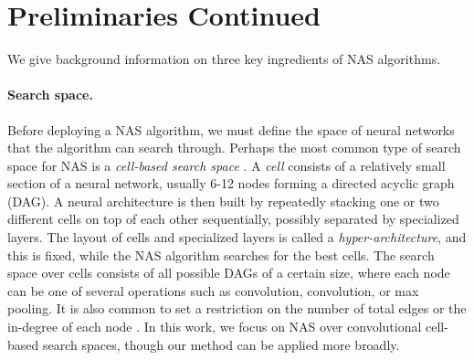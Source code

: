 \documentclass[11pt]{article}
\numberwithin{equation}{section}
\numberwithin{figure}{section}
\theoremstyle{plain}
\theoremstyle{definition}
\let\citep\cite
\begin{document}
\begin{comment}
\paragraph{Subsequent work.}
Since its release, several papers have independently verified that BANANAS is 
state of the art~\citep{remaade, nasbench301},
or second only to follow-up work~\citep{nguyen2020optimal, nasbowl, npenas}.
Notably, one paper~\citep{remaade} showed that BANANAS is state-of-the-art on NASBench-101
when given a budget of 3200 evaluations, and another paper~\citep{nasbench301} showed that
BANANAS is state-of-the-art on a new surrogate benchmark on the DARTS
search space.
Finally, a recent paper conducted a study on several encodings used for 
NAS~\cite{white2020study}, concluding that the path encoding,
even when truncated, is particularly well-suited for neural predictors.
In particular, as mentioned in Section~\ref{sec:methodology}, the path encoding is not
one-to-one (multiple architectures can map to the same encoding), but they show that only architectures with very similar accuracy map to the same encoding, meaning that
this actually \emph{improves} NAS performance.
Furthermore, they improved upon the theoretical results we presented in
Section~\ref{sec:methodology} by proving a result that is similar to 
Theorem~\ref{thm:path_length_informal} where  is independent of , 
and they also show a matching lower bound.
\end{comment}
 \section{Preliminaries Continued}
\label{app:preliminaries}
We give background information on three 
key ingredients of NAS algorithms.
\paragraph{Search space.}
Before deploying a NAS algorithm, we must define the space of neural networks that the algorithm can search through.
Perhaps the most common type of search space for NAS is a \emph{cell-based search space} \cite{zoph2017neural, enas, darts, randomnas, sciuto2019evaluating, nasbench}.
A \emph{cell} consists of a
relatively small section of a neural network, usually 6-12
nodes forming a directed acyclic graph (DAG). 
A neural architecture is then built by
repeatedly stacking one or two different cells on top of each
other sequentially, possibly separated by specialized layers. The
layout of cells and specialized layers is called a
\emph{hyper-architecture}, and this is fixed, while the NAS
algorithm searches for the best cells. The search space over
cells consists of all possible DAGs of a certain size, 
where each node can be one of several operations such as  convolution,  convolution, or  max pooling. 
It is also common to set a restriction on the number of total edges or
the in-degree of each node \cite{nasbench, darts}.
In this work, we focus on NAS over convolutional cell-based search spaces,
though our method can be applied more broadly.
\end{document}
